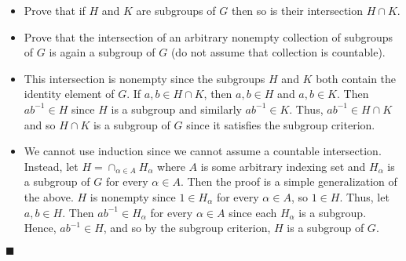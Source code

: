 \documentclass[12pt]{article}
\renewcommand{\qed}{\hfill$\blacksquare$}
\renewenvironment{proof}{\begin{addmargin}[1em]{0em}\begin{newproof}}{\end{newproof}\end{addmargin}\qed}
\newenvironment{problem}[2][Exercise]{\begin{trivlist}
\item[\hskip \labelsep {\bfseries #1}\hskip \labelsep {\bfseries #2.}]}{\end{trivlist}}
\begin{document}
\begin{problem}{2.1.10}
\begin{itemize}
	\item Prove that if $H$ and $K$ are subgroups of $G$ then so is their intersection $H\cap K$.
	\item Prove that the intersection of an arbitrary nonempty collection of subgroups of $G$ is again a subgroup of $G$ (do not assume that collection is countable).
\end{itemize}
\end{problem}
\begin{proof}
\begin{itemize}
	\item This intersection is nonempty since the subgroups $H$ and $K$ both contain the identity element of $G$. If $a,b \in H\cap K$, then $a,b \in H$ and $a,b\in K$. Then $ab^{-1} \in H$ since $H$ is a subgroup and similarly $ab^{-1}\in K$. Thus, $ab^{-1} \in H\cap K$ and so $H\cap K$ is a subgroup of $G$ since it satisfies the subgroup criterion.
	\item We cannot use induction since we cannot assume a countable intersection. Instead, let $H = \cap_{\alpha \in A} H_{\alpha}$ where $A$ is some arbitrary indexing set and $H_{\alpha}$ is a subgroup of $G$ for every $\alpha \in A$. Then the proof is a simple generalization of the above. $H$ is nonempty since $1 \in H_{\alpha}$ for every $\alpha \in A$, so $1\in H$. Thus, let $a,b \in H$. Then $ab^{-1} \in H_{\alpha}$ for every $\alpha \in A$ since each $H_{\alpha}$ is a subgroup. Hence, $ab^{-1} \in H$, and so by the subgroup criterion, $H$ is a subgroup of $G$.
\end{itemize}
\end{proof}
\end{document}
